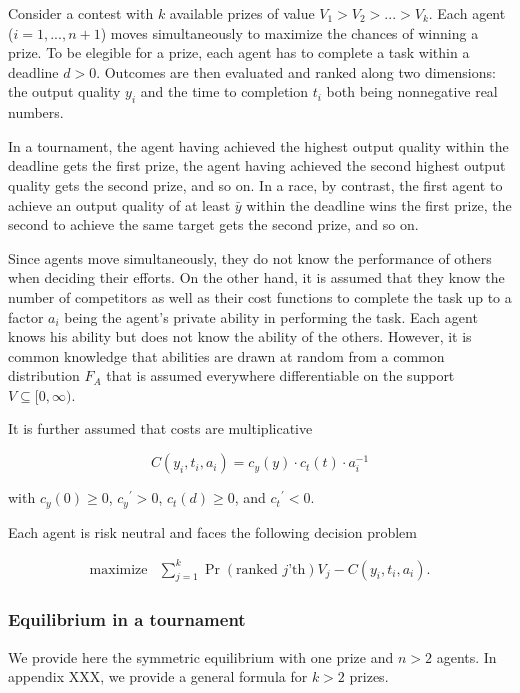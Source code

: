 \documentclass[12pt,]{article}
\begin{document}
Consider a contest with \(k\) available prizes of value
\(V_1 > V_2 > ... > V_k\). Each agent (\(i=1, ..., n+1\)) moves
simultaneously to maximize the chances of winning a prize. To be
elegible for a prize, each agent has to complete a task within a
deadline \(d>0\). Outcomes are then evaluated and ranked along two
dimensions: the output quality \(y_i\) and the time to completion
\(t_i\) both being nonnegative real numbers.

In a tournament, the agent having achieved the highest output quality
within the deadline gets the first prize, the agent having achieved the
second highest output quality gets the second prize, and so on. In a
race, by contrast, the first agent to achieve an output quality of at
least \({\bar y}\) within the deadline wins the first prize, the second
to achieve the same target gets the second prize, and so on.

Since agents move simultaneously, they do not know the performance of
others when deciding their efforts. On the other hand, it is assumed
that they know the number of competitors as well as their cost functions
to complete the task up to a factor \(a_i\) being the agent's private
ability in performing the task. Each agent knows his ability but does
not know the ability of the others. However, it is common knowledge that
abilities are drawn at random from a common distribution \(F_A\) that is
assumed everywhere differentiable on the support
\(V\subseteq [0, \infty)\).

It is further assumed that costs are multiplicative

\[C(y_i, t_i, a_i) = {c_{y}}(y) \cdot {c_{t}}(t)  \cdot a_i^{-1}\]

with \({c_{y}}(0)\geq 0\), \({c_{y}}^\prime>0\), \({c_{t}}(d)\geq 0\),
and \({c_{t}}^\prime<0\).

Each agent is risk neutral and faces the following decision problem

\[\begin{array}{ll}
    \mbox{maximize} & \sum_{j=1}^k \Pr(\text{ranked $j$'th}) V_j  - C(y_i, t_i, a_i).
  \end{array}\]

\subsubsection{Equilibrium in a
tournament}\label{equilibrium-in-a-tournament}

We provide here the symmetric equilibrium with one prize and \(n>2\)
agents. In appendix XXX, we provide a general formula for \(k>2\)
prizes.
\end{document}
